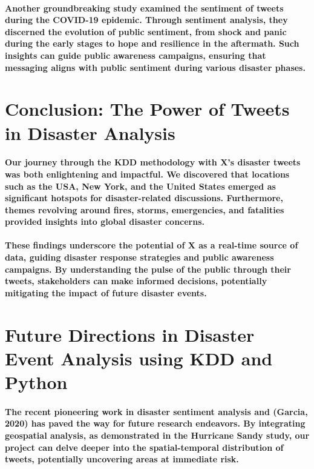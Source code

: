 \documentclass{article}
\begin{document}
\paragraph{Another groundbreaking study \cite{manuel_b__garcia_0996eb89} examined the sentiment of tweets during the COVID-19 epidemic. Through sentiment analysis, they discerned the evolution of public sentiment, from shock and panic during the early stages to hope and resilience in the aftermath. Such insights can guide public awareness campaigns, ensuring that messaging aligns with public sentiment during various disaster phases.}
\section{Conclusion: The Power of Tweets in Disaster Analysis}
\paragraph{Our journey through the KDD methodology with X's disaster tweets was both enlightening and impactful. We discovered that locations such as the USA, New York, and the United States emerged as significant hotspots for disaster-related discussions. Furthermore, themes revolving around fires, storms, emergencies, and fatalities provided insights into global disaster concerns.}
\paragraph{These findings underscore the potential of X as a real-time source of data, guiding disaster response strategies and public awareness campaigns. By understanding the pulse of the public through their tweets, stakeholders can make informed decisions, potentially mitigating the impact of future disaster events.}
\section{Future Directions in Disaster Event Analysis using KDD and Python}
\paragraph{The recent pioneering work in disaster sentiment analysis \cite{nastaran_pourebrahim_ccfadf88} and (Garcia, 2020) has paved the way for future research endeavors. By integrating geospatial analysis, as demonstrated in the Hurricane Sandy study, our project can delve deeper into the spatial-temporal distribution of tweets, potentially uncovering areas at immediate risk.}
\end{document}
